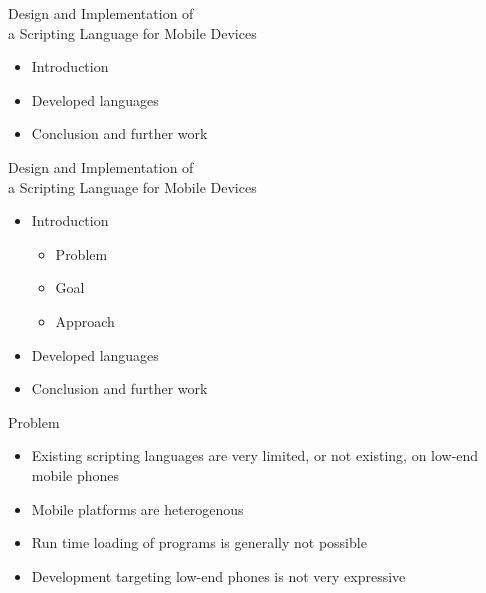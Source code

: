 \documentclass[a4paper,landscape]{slides}
\begin{document}
\begin{slide}
        {\large Design and Implementation of \\ a Scripting Language for Mobile Devices \\ \mbox{}}
\begin{itemize}
\item Introduction 
\item Developed languages 
\item Conclusion and further work 
\end{itemize}
\end{slide}

\begin{slide}
        {\large Design and Implementation of \\ a Scripting Language for Mobile Devices \\ \mbox{}}
\begin{itemize}\addtolength{\itemsep}{-\baselineskip}
\item Introduction 
        \begin{itemize}
            \item Problem
            \item Goal
            \item Approach
        \end{itemize}
\item Developed languages 
\item Conclusion and further work 
\end{itemize}
\end{slide}


\begin{slide}
	{\large 
            Problem
	\\ \mbox{}}
	\begin{itemize} \setlength{\itemsep}{10mm}
            \item Existing scripting languages are very limited, or not existing, on low-end mobile phones
	\end{itemize}
	\begin{itemize} \setlength{\itemsep}{3mm}
            \item Mobile platforms are heterogenous
            \item Run time loading of programs is generally not possible
            \item Development targeting low-end phones is not very expressive
	\end{itemize}
\end{slide}
\end{document}
